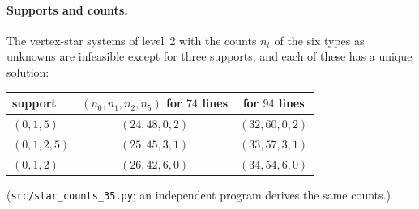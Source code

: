 \documentclass[11pt]{article}
\theoremstyle{definition}
\begin{document}
\paragraph{Supports and counts.} The vertex-star systems of level~2 with the counts $n_t$ of the six
types as unknowns are infeasible except for three supports, and each of these has a unique solution:

\smallskip
\begin{center}
\begin{tabular}{lcc}
\toprule
support & $(n_0,n_1,n_2,n_5)$ for $74$ lines & for $94$ lines\\
\midrule
$(0,1,5)$ & $(24,48,0,2)$ & $(32,60,0,2)$\\
$(0,1,2,5)$ & $(25,45,3,1)$ & $(33,57,3,1)$\\
$(0,1,2)$ & $(26,42,6,0)$ & $(34,54,6,0)$\\
\bottomrule
\end{tabular}
\end{center}
\smallskip
(\texttt{src/star\_counts\_35.py}; an independent program derives the same counts.)
\end{document}
